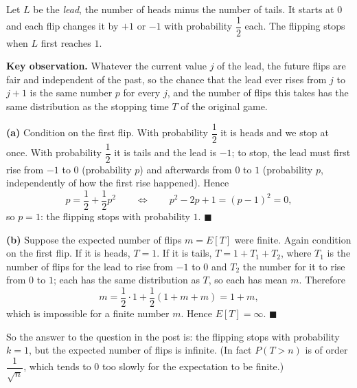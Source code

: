 Let $L$ be the \emph{lead}, the number of heads minus the number of tails. It starts at $0$ and each flip changes it by $+1$ or $-1$ with probability $\dfrac{1}{2}$ each. The flipping stops when $L$ first reaches $1$.

\textbf{Key observation.} Whatever the current value $j$ of the lead, the future flips are fair and independent of the past, so the chance that the lead ever rises from $j$ to $j+1$ is the same number $p$ for every $j$, and the number of flips this takes has the same distribution as the stopping time $T$ of the original game.

\textbf{(a)} Condition on the first flip. With probability $\dfrac{1}{2}$ it is heads and we stop at once. With probability $\dfrac{1}{2}$ it is tails and the lead is $-1$; to stop, the lead must first rise from $-1$ to $0$ (probability $p$) and afterwards from $0$ to $1$ (probability $p$, independently of how the first rise happened). Hence
\[
p=\dfrac{1}{2}+\dfrac{1}{2}p^2\qquad\Longleftrightarrow\qquad p^2-2p+1=(p-1)^2=0,
\]
so $p=1$: the flipping stops with probability $1$. $\blacksquare$

\textbf{(b)} Suppose the expected number of flips $m=E[T]$ were finite. Again condition on the first flip. If it is heads, $T=1$. If it is tails, $T=1+T_1+T_2$, where $T_1$ is the number of flips for the lead to rise from $-1$ to $0$ and $T_2$ the number for it to rise from $0$ to $1$; each has the same distribution as $T$, so each has mean $m$. Therefore
\[
m=\dfrac{1}{2}\cdot1+\dfrac{1}{2}\left(1+m+m\right)=1+m,
\]
which is impossible for a finite number $m$. Hence $E[T]=\infty$. $\blacksquare$

So the answer to the question in the post is: the flipping stops with probability $k=1$, but the expected number of flips is infinite. (In fact $P(T>n)$ is of order $\dfrac{1}{\sqrt n}$, which tends to $0$ too slowly for the expectation to be finite.)
